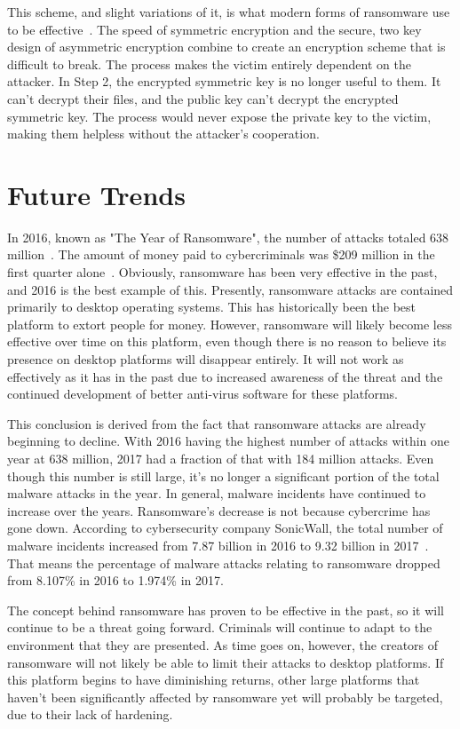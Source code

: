\documentclass{IEEEtran}
\begin{document}
This scheme, and slight variations of it, is what modern forms of ransomware use to be effective~\cite{RN24}. The speed of symmetric encryption and the secure, two key design of asymmetric encryption combine to create an encryption scheme that is difficult to break. The process makes the victim entirely dependent on the attacker. In Step 2, the encrypted symmetric key is no longer useful to them. It can't decrypt their files, and the public key can't decrypt the encrypted symmetric key. The process would never expose the private key to the victim, making them helpless without the attacker’s cooperation.

\section{Future Trends}

In 2016, known as "The Year of Ransomware", the number of attacks totaled 638 million~\cite{RN17}. The amount of money paid to cybercriminals was \$209 million in the first quarter alone~\cite{RN14}. Obviously, ransomware has been very effective in the past, and 2016 is the best example of this. Presently, ransomware attacks are contained primarily to desktop operating systems. This has historically been the best platform to extort people for money. However, ransomware will likely become less effective over time on this platform, even though there is no reason to believe its presence on desktop platforms will disappear entirely. It will not work as effectively as it has in the past due to increased awareness of the threat and the continued development of better anti-virus software for these platforms. 

This conclusion is derived from the fact that ransomware attacks are already beginning to decline. With 2016 having the highest number of attacks within one year at 638 million, 2017 had a fraction of that with 184 million attacks. Even though this number is still large, it's no longer a significant portion of the total malware attacks in the year. In general, malware incidents have continued to increase over the years. Ransomware's decrease is not because cybercrime has gone down. According to cybersecurity company SonicWall, the total number of malware incidents increased from 7.87 billion in 2016 to 9.32 billion in 2017~\cite{RN15}. That means the percentage of malware attacks relating to ransomware dropped from 8.107\% in 2016 to 1.974\% in 2017. 

The concept behind ransomware has proven to be effective in the past, so it will continue to be a threat going forward. Criminals will continue to adapt to the environment that they are presented. As time goes on, however, the creators of ransomware will not likely be able to limit their attacks to desktop platforms. If this platform begins to have diminishing returns, other large platforms that haven't been significantly affected by ransomware yet will probably be targeted, due to their lack of hardening.
\end{document}
